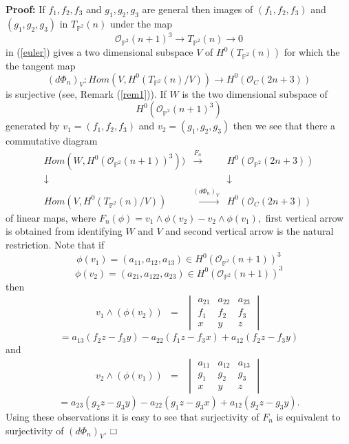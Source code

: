 \documentclass[11pt]{amsart}
\theoremstyle{definition}
\renewcommand\square{\frame{\phantom{{\large x}}}}
\begin{document}
{\bf Proof:} If $f_1, f_2, f_3$ and $g_1, g_2, g_3$ are general then 
images of 
$(f_1, f_2, f_3)$ and $(g_1, g_2, g_3)$ in $T_{\mathbb{P}^2}(n)$
under the map 
\[{\mathcal O}_{\mathbb{P}^2}(n+1)^3 \to T_{\mathbb{P}^2}(n) \to 0\]
in (\ref{euler}) gives a two dimensional subspace $V$ of
$H^0(T_{\mathbb{P}^2}(n))$
for which the the tangent map
\[
(d\Phi_n)_V: Hom(V,H^0(T_{\mathbb{P}^2}(n)/V)) \to H^0(\mathcal O_{C}
(2n+3))  \]
is surjective (see, Remark (\ref{rem1})). If $W$ is the two dimensional
subspace of
$$H^0({\mathcal O}_{\mathbb{P}^2}(n+1)^3)$$
generated by $v_1=(f_1, f_2, f_3)$ and $v_2=(g_1, g_2, g_3)$ then we see
that there a commutative diagram
\[\begin{array}{ccc}
Hom(W,H^0(\mathcal{O}_{\mathbb{P}^2}(n+1))^3))& \stackrel{F_n}
{\longrightarrow} & H^0(\mathcal O_{\mathbb{P}^2}(2n+3))\\
\downarrow & {} & \downarrow \\
Hom(V,H^0(T_{\mathbb{P}^2}(n)/V))& \stackrel{(d\Phi_n)_V}
{\longrightarrow} &H^0(\mathcal O_{C}(2n+3))
\end{array}\]
of linear maps, where $F_n(\phi) = v_1 \wedge \phi(v_2) - v_2 \wedge 
\phi(v_1),$
first vertical arrow is obtained from identifying $W$ and $V$ and second
vertical arrow
is the natural restriction. Note that if 
\[\phi(v_1) = (a_{11}, a_{12}, a_{13}) \in H^0(\mathcal{O}_{\mathbb{P}^2}
(n+1))^3 \]
\[\phi(v_2) = (a_{21}, a_{122}, a_{23}) \in 
H^0(\mathcal{O}_{\mathbb{P}^2}(n+1))^3 \]
then 
\[ \begin{array}{ccc}
 v_1\wedge (\phi(v_2))  & = &\begin{vmatrix}
                            a_{21} & a_{22} & a_{23}\\
                            f_1  & f_2 & f_3 \\
                            x & y & z
                            \end{vmatrix}   
\end{array} \]
\[
= a_{13}(f_2 z-f_3 y) -a_{22}(f_1 z-f_3 x) +a_{12}(f_2 z-f_3 y) 
\]
and 
\[ \begin{array}{ccc}
 v_2\wedge (\phi(v_1))  & = &\begin{vmatrix}
                            a_{11} & a_{12} & a_{13}\\
                            g_1  & g_2 & g_3 \\
                            x & y & z
                            \end{vmatrix}   
\end{array} \]
\[
= a_{23}(g_2 z-g_3 y) -a_{22}(g_1 z-g_3 x) +a_{12}(g_2 z-g_3 y). 
\]
Using these observations it is easy to see that surjectivity of $F_n$ is 
equivalent to surjectivity of $(d\Phi_n)_V.$  $\hfill{\square}$
\end{document}
